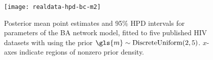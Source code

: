 %
%
\begin{figure}[ht]
    \texttt{[image: realdata-hpd-bc-m2]}
    \caption[
        Posterior mean point estimates and 95\% \gls{HPD} intervals for
        parameters of the \gls{BA} network model, fitted to eleven \gls{HIV}
        datasets with  using the prior \gls{m} $\sim$
        DiscreteUniform(2, 5).
    ]{
        Posterior mean point estimates and 95\% \gls{HPD} intervals for
        parameters of the \gls{BA} network model, fitted to five published
        \gls{HIV} datasets with  using the prior $\gls{m}
        \sim \DiscreteUniform(2, 5)$. $x$-axes indicate regions of nonzero
        prior density. 
    }
    \label{fig:abchpdm2}
\end{figure}

